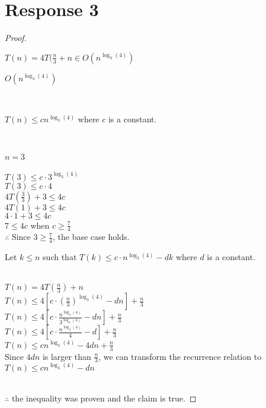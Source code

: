 \documentclass[12pt, a4paper]{article}
\begin{document}
\section*{\centering Response 3}
    \begin{proof}
        \begin{claim}
            \(T(n) = 4T(\frac{n}{3} + n \in O(n^{\log_{3}(4)})\)\\
        \end{claim}
        \begin{guess}
            \(O(n^{\log_{3}(4)})\)
        \end{guess}\\
        \begin{prove}
            \(T(n) \leq cn^{\log_{3}(4)}\) where \(c\) is a constant. 
        \end{prove}\\
        \begin{basecase}
            \(n = 3\)\\
            \\
            \(T(3) \le c \cdot 3^{\log_{3}(4)}\)\\
            \(T(3) \le c \cdot 4\)\\
            \(4T(\frac{3}{3}) + 3 \leq 4c\)\\
            \(4T(1) + 3 \leq 4c\)\\
            \(4 \cdot 1 + 3 \leq 4c\)\\
            \(7 \leq 4c\) when \(c \geq \frac{7}{4}\)\\
            $\therefore$ Since \(3 \geq \frac{7}{4}\), the base case holds.\\
        \end{basecase}
        \begin{inductivehypothesis}
            Let \(k \leq n\) such that \(T(k) \leq c \cdot n^{\log_{3}(4)} - dk\) where \(d\) is a constant.\\
        \end{inductivehypothesis}
        \begin{inductive}\\
            \(T(n) = 4T(\frac{n}{3}) + n\)\\
            \(T(n) \leq 4[c \cdot (\frac{n}{3})^{\log_{3}(4)} - dn] + \frac{n}{3}\)\\
            \(T(n) \leq 4[c \cdot \frac{n^{\log_{3}(4)}}{3^{\log_{3}(4)}} - dn] + \frac{n}{3}\)\\
            \(T(n) \leq 4[c \cdot \frac{n^{\log_{3}(4)}}{4} - d] + \frac{n}{3}\)\\
            \(T(n) \leq cn^{\log_{3}(4)} - 4dn + \frac{n}{3}\)\\
            Since \(4dn\) is larger than \(\frac{n}{3}\), we can transform the recurrence relation to \(T(n) \leq cn^{\log_{3}(4)}-dn\)
        \end{inductive}\\
        $\therefore$ the inequality was proven and the claim is true.

    \end{proof}
\end{document}
